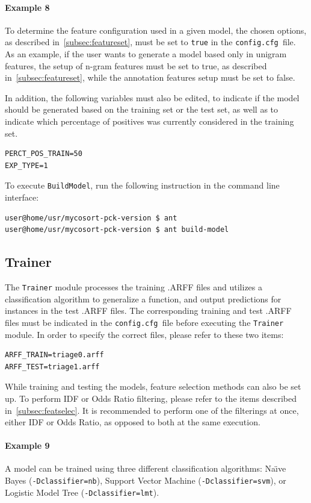\documentclass[11pt]{article}
\newcommand{\configfile}{\texttt{config.cfg{ }}}
\begin{document}
\paragraph{Example 8} 
To determine the feature configuration used in a given model, 
the chosen options, as described in~\ref{subsec:featureset}, 
must be set to \texttt{true} in the \configfile file.
As an example, if the user wants to generate a model based only in unigram features,
the setup of n-gram features must be set to true, as described in~\ref{subsec:featureset},
while the annotation features setup must be set to false.

In addition, the following variables must also be edited, 
to indicate if the model should be generated based on the training set or the test set,
as well as to indicate which percentage of positives was currently considered in the training set.
\begin{lstlisting}
PERCT_POS_TRAIN=50
EXP_TYPE=1
\end{lstlisting}

To execute \texttt{BuildModel}, run the following instruction in the command line interface:
\begin{lstlisting}
user@home/usr/mycosort-pck-version $ ant
user@home/usr/mycosort-pck-version $ ant build-model
\end{lstlisting}

\subsection{Trainer}
The \texttt{Trainer} module processes the training .ARFF files and utilizes a classification algorithm to
generalize a function, and output predictions for instances in the test .ARFF files.
The corresponding training and test .ARFF files must be indicated 
in the \configfile file before executing the \texttt{Trainer} module.
In order to specify the correct files, please refer to these two items:
\begin{lstlisting}
ARFF_TRAIN=triage0.arff
ARFF_TEST=triage1.arff
\end{lstlisting}

While training and testing the models, feature selection methods can also be set up.
To perform IDF or Odds Ratio filtering, please refer to the items described in~\ref{subsec:featselec}.
It is recommended to perform one of the filterings at once, either IDF or Odds Ratio,
as opposed to both at the same execution.

\paragraph{Example 9}
A model can be trained using three different classification algorithms: 
{Na\"{\i}ve} Bayes (\texttt{-Dclassifier=nb}), Support Vector Machine (\texttt{-Dclassifier=svm}), or Logistic Model Tree (\texttt{-Dclassifier=lmt}).
\end{document}
